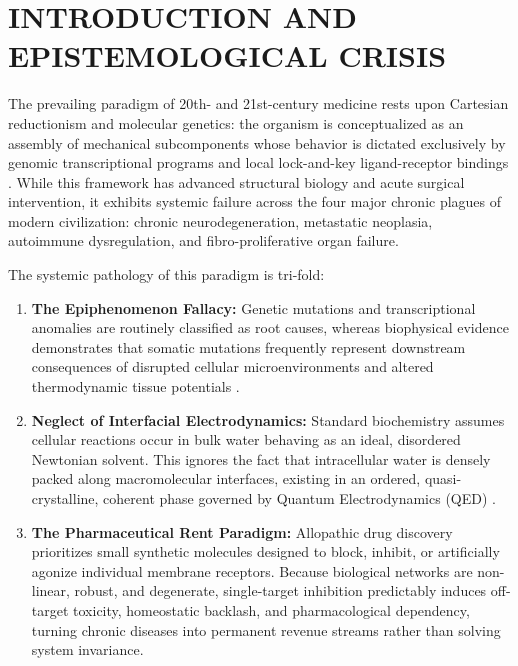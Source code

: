 \documentclass[10pt,twocolumn]{article}
\begin{document}
\vspace{1em}






\section{INTRODUCTION AND EPISTEMOLOGICAL CRISIS}

The prevailing paradigm of 20th- and 21st-century medicine rests upon Cartesian reductionism and molecular genetics: the organism is conceptualized as an assembly of mechanical subcomponents whose behavior is dictated exclusively by genomic transcriptional programs and local lock-and-key ligand-receptor bindings \cite{Alberts2017}. While this framework has advanced structural biology and acute surgical intervention, it exhibits systemic failure across the four major chronic plagues of modern civilization: chronic neurodegeneration, metastatic neoplasia, autoimmune dysregulation, and fibro-proliferative organ failure.

The systemic pathology of this paradigm is tri-fold:
\begin{enumerate}
  \item \textbf{The Epiphenomenon Fallacy:} Genetic mutations and transcriptional anomalies are routinely classified as root causes, whereas biophysical evidence demonstrates that somatic mutations frequently represent downstream consequences of disrupted cellular microenvironments and altered thermodynamic tissue potentials \cite{Sonnenschein2016, Levin2021}.
  \item \textbf{Neglect of Interfacial Electrodynamics:} Standard biochemistry assumes cellular reactions occur in bulk water behaving as an ideal, disordered Newtonian solvent. This ignores the fact that intracellular water is densely packed along macromolecular interfaces, existing in an ordered, quasi-crystalline, coherent phase governed by Quantum Electrodynamics (QED) \cite{DelGiudice1988, Pollack2013}.
  \item \textbf{The Pharmaceutical Rent Paradigm:} Allopathic drug discovery prioritizes small synthetic molecules designed to block, inhibit, or artificially agonize individual membrane receptors. Because biological networks are non-linear, robust, and degenerate, single-target inhibition predictably induces off-target toxicity, homeostatic backlash, and pharmacological dependency, turning chronic diseases into permanent revenue streams rather than solving system invariance.
\end{enumerate}
\end{document}
